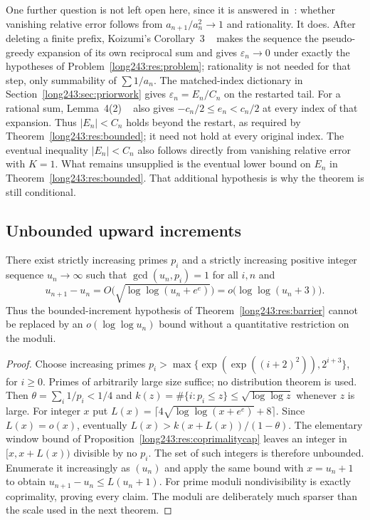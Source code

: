\documentclass[11pt]{article}
\begin{document}
\begin{remark}\label{long243:rem:relative-error-boundary}
One further question is not left open here, since it is answered
in~\cite{koizumi2025}: whether vanishing relative error follows from
$a_{n+1}/a_n^{2}\to1$ and rationality.  It does.  After
deleting a finite prefix, Koizumi's Corollary~3
~\cite[p.~9]{koizumi2025} makes the sequence the pseudo-greedy expansion of its
own reciprocal sum and gives $\varepsilon_n\to0$ under exactly the hypotheses of
Problem~\ref{long243:res:problem}; rationality is not needed for that step, only
summability of $\sum1/a_n$.  The matched-index dictionary in
Section~\ref{long243:sec:priorwork} gives $\varepsilon_n=E_n/C_n$
on the restarted tail. For a rational sum, Lemma~4(2)
~\cite[pp.~11--12]{koizumi2025} also gives
$-c_n/2\le e_n<c_n/2$ at every index of that expansion. Thus
$|E_n|<C_n$ holds beyond the restart, as required by
Theorem~\ref{long243:res:bounded}; it need not hold at every original
index. The eventual inequality $|E_n|<C_n$ also follows directly from vanishing
relative error with $K=1$. What remains unsupplied is the eventual
lower bound on $E_n$ in Theorem~\ref{long243:res:bounded}.
That additional hypothesis is why the theorem is still conditional.
\end{remark}

\subsection{Unbounded upward increments}

\begin{proposition}\label{long243:res:variablerise}
There exist strictly increasing primes $p_i$ and a strictly increasing
positive integer sequence $u_n\to\infty$ such that $\gcd(u_n,p_i)=1$ for
all $i,n$ and
\[
 u_{n+1}-u_n=O\bigl(\sqrt{\log\log(u_n+e^e)}\bigr)
             =o\bigl(\log\log(u_n+3)\bigr).
\]
Thus the bounded-increment hypothesis of
Theorem~\ref{long243:res:barrier} cannot be replaced by an
$o(\log\log u_n)$ bound without a quantitative restriction on the
moduli.
\end{proposition}

\begin{proof}
Choose increasing primes
$p_i>\max\{\exp(\exp((i+2)^2)),2^{i+3}\}$, for $i\ge0$.
Primes of arbitrarily large size suffice; no distribution theorem is used.
Then $\theta=\sum_i1/p_i<1/4$ and
$k(z)=\#\{i:p_i\le z\}\le\sqrt{\log\log z}$ whenever $z$ is large.
For integer $x$ put
$L(x)=\lceil4\sqrt{\log\log(x+e^e)}+8\rceil$.
Since $L(x)=o(x)$, eventually $L(x)>k(x+L(x))/(1-\theta)$.
The elementary window bound of
Proposition~\ref{long243:res:coprimalitycap} leaves an integer in
$[x,x+L(x))$ divisible by no $p_i$. The set of such integers is therefore
unbounded. Enumerate it increasingly as $(u_n)$ and apply the same bound
with $x=u_n+1$ to obtain $u_{n+1}-u_n\le L(u_n+1)$.
For prime moduli nondivisibility is exactly coprimality, proving every
claim. The moduli are deliberately much sparser than the scale used in
the next theorem.
\end{proof}
\end{document}
